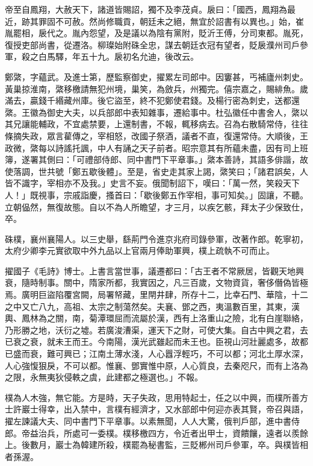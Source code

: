 \begin{pinyinscope}
 帝至自鳳翔，大赦天下，諸道皆賜詔，獨不及李茂貞。扆曰：「國西，鳳翔為最近，跡其罪固不可赦。然尚修職貢，朝廷未之絕，無宜於詔書有以異也。」始，崔胤罷相，扆代之。胤內怨望，及是議以為陰有黨附，貶沂王傅，分司東都。胤死，復授吏部尚書，從遷洛。柳璨始附硃全忠，謀去朝廷衣冠有望者，貶扆濮州司戶參軍，殺之白馬驛，年五十九。扆初名允迪，後改云。



 鄭綮，字蘊武。及進士第，歷監察御史，擢累左司郎中。因窶甚，丐補廬州刺史。黃巢掠淮南，綮移檄請無犯州境，巢笑，為斂兵，州獨完。僖宗嘉之，賜緋魚。歲滿去，贏錢千緡藏州庫。後它盜至，終不犯鄭使君錢。及楊行密為刺史，送都還綮。王徽為御史大夫，以兵部郎中表知雜事，遷給事中。杜弘徽任中書舍人，綮以其兄讓能輔政，不宜處禁要，上還制書，不報，輒移病去。召為右散騎常侍，往往條摘失政，眾言雚傳之，宰相怒，改國子祭酒，議者不直，復還常侍。大順後，王政微，綮每以詩謠托諷，中人有誦之天子前者。昭宗意其有所蘊未盡，因有司上班簿，遂署其側曰：「可禮部侍郎、同中書門下平章事。」綮本善詩，其語多俳諧，故使落調，世共號「鄭五歇後體」。至是，省史走其家上謁，綮笑曰；「諸君誤矣，人皆不識字，宰相亦不及我。」史言不妄。俄聞制詔下，嘆曰：「萬一然，笑殺天下人！」既視事，宗戚詣慶，搔首曰：「歇後鄭五作宰相，事可知矣。」固讓，不聽。立朝偘然，無復故態。自以不為人所瞻望，才三月，以疾乞骸，拜太子少保致仕，卒。



 硃樸，襄州襄陽人。以三史舉，繇荊門令進京兆府司錄參軍，改著作郎。乾寧初，太府少卿李元實欲取中外九品以上官兩月俸助軍興，樸上疏執不可而止。



 擢國子《毛詩》博士。上書言當世事，議遷都曰：「古王者不常厥居，皆觀天地興衰，隨時制事。關中，隋家所都，我實因之，凡三百歲，文物資貨，奢侈僭偽皆極焉。廣明巨盜陷覆宮闕，局署帑藏，里閈井肆，所存十二，比幸石門、華陰，十二之中又亡八九，高祖、太宗之制蕩然矣。夫襄、鄧之西，夷溫數百里，其東，漢輿、鳳林為之關，南，菊潭環屈而流屬於漢，西有上洛重山之險，北有白崖聯絡，乃形勝之地，沃衍之墟。若廣浚漕渠，運天下之財，可使大集。自古中興之君，去已衰之衰，就未王而王。今南陽，漢光武雖起而未王也。臣視山河壯麗處多，故都已盛而衰，難可興已；江南土薄水淺，人心囂浮輕巧，不可以都；河北土厚水深，人心強愎狠戾，不可以都。惟襄、鄧實惟中原，人心質良，去秦咫尺，而有上洛為之限，永無夷狄侵軼之虞，此建都之極選也。」不報。



 樸為人木強，無它能。方是時，天子失政，思用特起士，任之以中興，而樸所善方士許巖士得幸，出入禁中，言樸有經濟才，又水部郎中何迎亦表其賢，帝召與語，擢左諫議大夫、同中書門下平章事。以素無聞，人人大驚，俄判戶部，進中書侍郎。帝益治兵，所處可一委樸。樸移檄四方，令近者出甲士，資饋饟，遠者以羨餘上。後數月，巖士為韓建所殺，樸罷為秘書監，三貶郴州司戶參軍，卒。與樸皆相者孫渥。




\end{pinyinscope}
